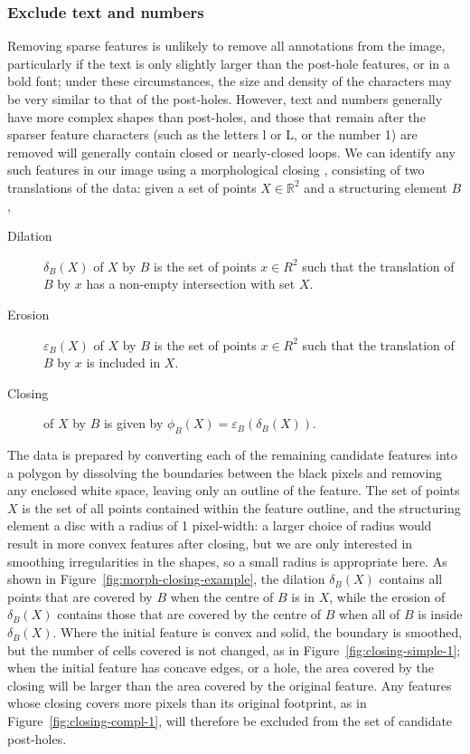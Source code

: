 \documentclass[../../ArchStats.tex]{subfiles}
\begin{document}
\subsubsection{Exclude text and numbers}
\label{sec:closing}

Removing sparse features is unlikely to remove all annotations from the image, particularly if the text is only slightly larger than the post-hole features, or in a bold font; under these circumstances, the size and density of the characters may be very similar to that of the post-holes. However, text and numbers generally have more complex shapes than post-holes, and those that remain after the sparser feature characters (such as the letters l or L, or the number 1) are removed will generally contain closed or nearly-closed loops. We can identify any such features in our image using a morphological closing \cite{Serra1983}, consisting of two translations of the data: given a set of points $X \in \mathbb{R}^2$ and a structuring element $B$ \cite{Vincent1997},

\begin{description}
\item[Dilation] $\delta_B(X)$ of $X$ by $B$ is the set of points $x \in R^2$ such that the translation of $B$ by $x$ has a non-empty intersection with set $X$.
\vspace{-25pt}
\item[Erosion] $\varepsilon_B(X)$ of $X$ by $B$ is the set of points $x \in R^2$ such that the translation of $B$ by $x$ is included in $X$.
\vspace{-25pt}
\item[Closing] of $X$ by $B$ is given by $\phi_B(X) = \varepsilon_B(\delta_B(X))$.
\end{description}


The data is prepared by converting each of the remaining candidate features into a polygon by dissolving the boundaries between the black pixels and removing any enclosed white space, leaving only an outline of the feature. The set of points $X$ is the set of all points contained within the feature outline, and the structuring element a disc with a radius of 1 pixel-width: a larger choice of radius would result in more convex features after closing, but we are only interested in smoothing irregularities in the shapes, so a small radius is appropriate here. As shown in Figure~\ref{fig:morph-closing-example}, the dilation $\delta_B(X)$ contains all points that are covered by $B$ when the centre of $B$ is in $X$, while the erosion of $\delta_B(X)$ contains those that are covered by the centre of $B$ when all of $B$ is inside $\delta_B(X)$. Where the initial feature is convex and solid, the boundary is smoothed, but the number of cells covered is not changed, as in Figure~\ref{fig:closing-simple-1}; when the initial feature has concave edges, or a hole, the area covered by the closing will be larger than the area covered by the original feature. Any features whose closing covers more pixels than its original footprint, as in Figure~\ref{fig:closing-compl-1}, will therefore be excluded from the set of candidate post-holes.
\end{document}
